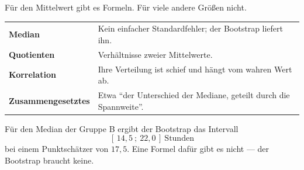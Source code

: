 \begin{merksatz}
Für den Mittelwert gibt es Formeln. Für viele andere Größen nicht.

\begin{center}
\renewcommand{\arraystretch}{1.5}
\begin{tabular}{@{}P{3.2cm}P{5.4cm}@{}}
\toprule
\textbf{Median} & Kein einfacher Standardfehler; der Bootstrap liefert ihn.\\
\textbf{Quotienten} & Verhältnisse zweier Mittelwerte.\\
\textbf{Korrelation} & Ihre Verteilung ist schief und hängt vom wahren Wert ab.\\
\textbf{Zusammen\-gesetztes} & Etwa \enquote{der Unterschied der Mediane, geteilt durch die Spannweite}.\\
\bottomrule
\end{tabular}
\end{center}

Für den Median der Gruppe B ergibt der Bootstrap das Intervall
\[ [\,14{,}5\ ;\ 22{,}0\,] \ \text{Stunden} \]
bei einem Punktschätzer von $17{,}5$. Eine Formel dafür gibt es nicht --- der Bootstrap braucht keine.

\begin{center}
\begin{minipage}{0.88\textwidth}
\end{minipage}
\end{center}
\end{merksatz}

